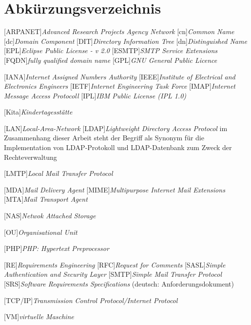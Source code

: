 
\chapter*{Abkürzungsverzeichnis}
\markboth{}{}

\begin{acronym}[]
[ARPANET]{\textit{Advanced Research Projects Agency Network}}
[cn]{\textit{Common Name}}
[dc]{\textit{Domain Component}}
[DIT]{\textit{Directory Information Tree}}
[dn]{\textit{Distinguished Name}}
[EPL]{\textit{Eclipse Public License - v 2.0}}
[ESMTP]{\textit{SMTP Service Extensions}}
[FQDN]{\textit{fully qualified domain name}}
[GPL]{\textit{GNU General Public Licence}}

[IANA]{\textit{Internet Assigned Numbers Authority}}
[IEEE]{\textit{Institute of Electrical and Electronics Engineers}}
[IETF]{\textit{Internet Engineering Task Force}}
[IMAP]{\textit{Internet Message Access Protocoll}}
[IPL]{\textit{IBM Public License (IPL 1.0)}}


[Kita]{\textit{Kindertagesstätte}}

[LAN]{\textit{Local-Area-Network}}
[LDAP]{\textit{Lightweight Directory Access Protocol}}
im Zusammenhang dieser Arbeit steht der Begriff als Synonym für die Implementation von LDAP-Protokoll und LDAP-Datenbank zum Zweck der Rechteverwaltung

[LMTP]{\textit{Local Mail Transfer Protocol}}

[MDA]{\textit{Mail Delivery Agent}}
[MIME]{\textit{Multipurpose Internet Mail Extensions}}
[MTA]{\textit{Mail Transport Agent}}

[NAS]{\textit{Netwok Attached Storage}}

[OU]{\textit{Organisational Unit}}

[PHP]{\textit{PHP: Hypertext Preprocessor}}


[RE]{\textit{Requirements Engineering}}
[RFC]{\textit{Request for Comments}}
[SASL]{\textit{Simple Authentication and Security Layer}}
[SMTP]{\textit{Simple Mail Transfer Protocol}}
[SRS]{\textit{Software Requirements Specifications}} (deutsch: Anforderungsdokument)

[TCP/IP]{\textit{Transmission Control Protocol/Internet Protocol}}

[VM]{\textit{virtuelle Maschine}}








\end{acronym}